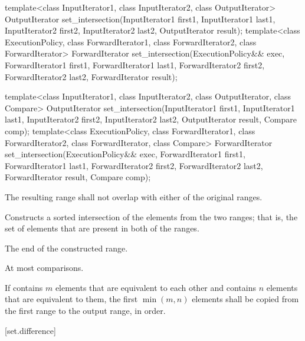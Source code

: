 %
\begin{itemdecl}
template<class InputIterator1, class InputIterator2,
         class OutputIterator>
  OutputIterator
    set_intersection(InputIterator1 first1, InputIterator1 last1,
                     InputIterator2 first2, InputIterator2 last2,
                     OutputIterator result);
template<class ExecutionPolicy, class ForwardIterator1, class ForwardIterator2,
         class ForwardIterator>
  ForwardIterator
    set_intersection(ExecutionPolicy&& exec,
                     ForwardIterator1 first1, ForwardIterator1 last1,
                     ForwardIterator2 first2, ForwardIterator2 last2,
                     ForwardIterator result);

template<class InputIterator1, class InputIterator2,
         class OutputIterator, class Compare>
  OutputIterator
    set_intersection(InputIterator1 first1, InputIterator1 last1,
                     InputIterator2 first2, InputIterator2 last2,
                     OutputIterator result, Compare comp);
template<class ExecutionPolicy, class ForwardIterator1, class ForwardIterator2,
         class ForwardIterator, class Compare>
  ForwardIterator
    set_intersection(ExecutionPolicy&& exec,
                     ForwardIterator1 first1, ForwardIterator1 last1,
                     ForwardIterator2 first2, ForwardIterator2 last2,
                     ForwardIterator result, Compare comp);
\end{itemdecl}

\begin{itemdescr}
\pnum
\requires
The resulting range shall not overlap with either of the original ranges.

\pnum
\effects
Constructs a sorted intersection of the elements from the two ranges;
that is, the set of elements that are present in both of the ranges.

\pnum
\returns
The end of the constructed range.

\pnum
\complexity
At most
comparisons.

\pnum
\remarks If  contains $m$ elements that are equivalent to
each other and  contains $n$ elements that are equivalent
to them, the first $\min(m, n)$ elements shall be copied from the first range
to the output range, in order.
\end{itemdescr}

[set.difference]{}

